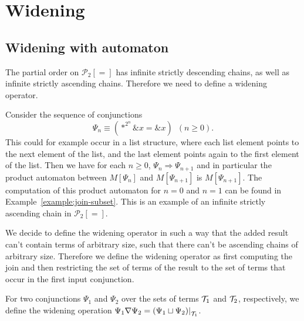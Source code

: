 \section{Widening}

\subsection{Widening with automaton}


The partial order on $\mathcal{P}_2[=]$ has infinite strictly descending chains, as well as
infinite strictly ascending chains. Therefore we need to define a widening operator.

\begin{example}
    Consider the sequence of conjunctions
    \[
        \Psi_n \equiv (*^{2^n} \&x = \&x)\hspace{6pt} (n\geq 0).
    \]
   This could for example occur in a list structure, where each list element points to the next element of the list, and the last element points again to the first element of the list.
   Then we have for each $n \geq 0$, $\Psi_n \Longrightarrow \Psi_{n+1}$ and in particular the product automaton between $M[\Psi_n]$ and $M[\Psi_{n+1}]$ is $M[\Psi_{n+1}]$.
   The computation of this product automaton for $n = 0$ and $n = 1$ can be found in Example~\ref{example:join-subset}. This is an example of an infinite strictly ascending chain in $\mathcal{P}_2[=]$.
\end{example}

We decide to define the widening operator in such a way that the added result can't contain terms of arbitrary size, such that there can't be ascending chains of arbitrary size. Therefore we define the widening operator as first computing the join and then restricting the set of terms of the result to the set of terms that occur in the first input conjunction.

\begin{definition}
    For two conjunctions $\Psi_1$ and $\Psi_2$ over the sets of terms $\mathcal{T}_1$ and $\mathcal{T}_2$, respectively, we define the widening operation
     $\Psi_1 \widen \Psi_2 = \restr{(\Psi_1 \join \Psi_2)}{\T_1}$.
\end{definition}

